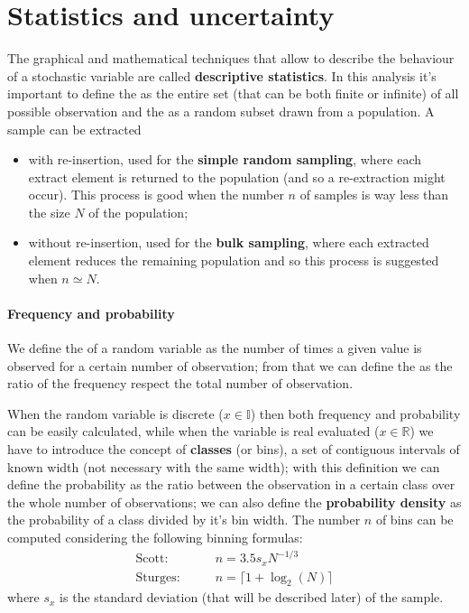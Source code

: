 \section{Statistics and uncertainty}
	The graphical and mathematical techniques that allow to describe the behaviour of a stochastic variable are called \textbf{descriptive statistics}. In this analysis it's important to define the  as the entire set (that can be both finite or infinite) of all possible observation and the  as a random subset drawn from a population.  A sample can be extracted
	\begin{itemize}
		\item with re-insertion, used for the \textbf{simple random sampling}, where each extract element is returned to the population (and so a re-extraction might occur). This process is good when the number $n$ of samples is way less than the size $N$ of the population;
		
		\item without re-insertion, used for the \textbf{bulk sampling}, where each extracted element reduces the remaining population and so this process is suggested when $n\simeq N$.
	\end{itemize}
	
	\paragraph{Frequency and probability} We define the  of a random variable as the number of times a given value is observed for a certain number of observation; from that we can define the  as the ratio of the frequency respect the total number of observation. 
	
	When the random variable is discrete ($x\in \mathds I$) then both frequency and probability can be easily calculated, while when the variable is real evaluated ($x\in \mathds R$) we have to introduce the concept of \textbf{classes} (or bins), a set of contiguous intervals of known width (not necessary with the same width); with this definition we can define the probability as the ratio between the observation in a certain class over the whole number of observations; we can also define the \textbf{probability density} as the probability of a class divided by it's bin width. The number $n$ of bins can be computed considering the following binning formulas: 
	\begin{equation}
	\begin{aligned}
		\textrm{Scott:}& \qquad n = 3.5 s_x N^{-1/3} \\ 
		\textrm{Sturges:}& \qquad n = \big\lceil 1 + \log_2(N) \big\rceil
	\end{aligned}
	\end{equation}
	where $s_x$ is the standard deviation (that will be described later) of the sample. 

